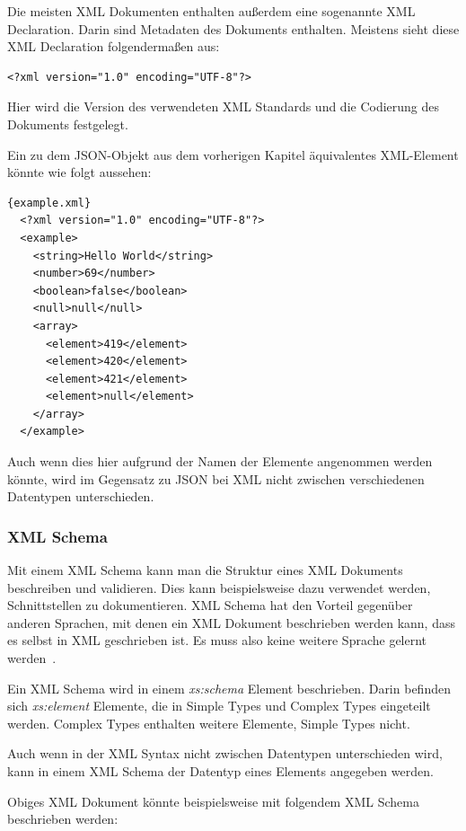 Die meisten XML Dokumenten enthalten außerdem eine sogenannte XML Declaration.
Darin sind Metadaten des Dokuments enthalten.
Meistens sieht diese XML Declaration folgendermaßen aus:

\begin{lstlisting}
<?xml version="1.0" encoding="UTF-8"?>
\end{lstlisting}

Hier wird die Version des verwendeten XML Standards und die Codierung des Dokuments festgelegt.

Ein zu dem JSON-Objekt aus dem vorherigen Kapitel äquivalentes XML-Element könnte wie folgt aussehen:

\begin{lstlisting}[label={lst:example.xml}]{example.xml}
  <?xml version="1.0" encoding="UTF-8"?>
  <example>
    <string>Hello World</string>
    <number>69</number>
    <boolean>false</boolean>
    <null>null</null>
    <array>
      <element>419</element>
      <element>420</element>
      <element>421</element>
      <element>null</element>
    </array>
  </example>
\end{lstlisting}

Auch wenn dies hier aufgrund der Namen der Elemente angenommen werden könnte, wird im Gegensatz zu JSON bei XML
nicht zwischen verschiedenen Datentypen unterschieden.

\subsubsection{XML Schema}
Mit einem XML Schema kann man die Struktur eines XML Dokuments beschreiben und validieren.
Dies kann beispielsweise dazu verwendet werden, Schnittstellen zu dokumentieren.
XML Schema hat den Vorteil gegenüber anderen Sprachen, mit denen ein XML Dokument beschrieben werden kann, dass es
selbst in XML geschrieben ist.
Es muss also keine weitere Sprache gelernt werden~\cite{xml-schema}.

Ein XML Schema wird in einem \textit{\<xs:schema\>} Element beschrieben.
Darin befinden sich \textit{\<xs:element\>} Elemente, die in Simple Types und Complex Types eingeteilt werden.
Complex Types enthalten weitere Elemente, Simple Types nicht.

Auch wenn in der XML Syntax nicht zwischen Datentypen unterschieden wird, kann in einem XML Schema der Datentyp
eines Elements angegeben werden.

Obiges XML Dokument könnte beispielsweise mit folgendem XML Schema beschrieben werden:

